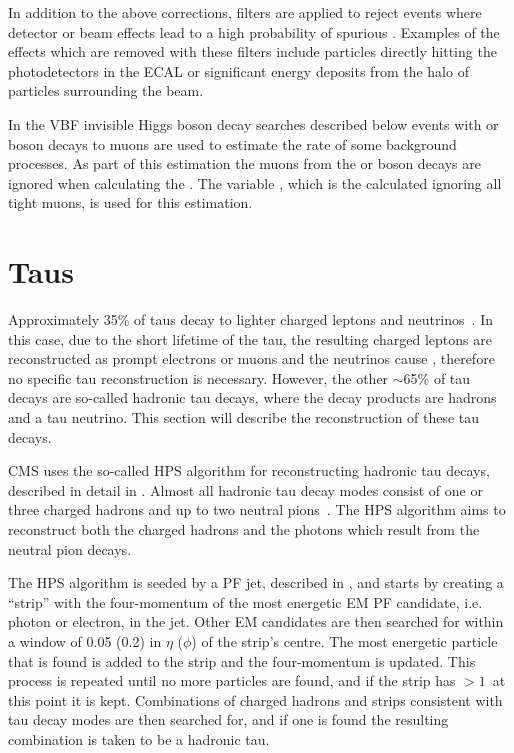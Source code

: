 {In addition to the above corrections, filters are applied to reject events where detector or beam effects lead to a high probability of spurious \MET. Examples of the effects which are removed with these filters include particles directly hitting the photodetectors in the \ac{ECAL} or significant energy deposits from the halo of particles surrounding the \LHC beam.

In the \ac{VBF} invisible Higgs boson decay searches described below events with \PW or \PZ boson decays to muons are used to estimate the rate of some background processes. As part of this estimation the muons from the \PW or \PZ boson decays are ignored when calculating the \MET. The variable \METnoMU, which is the \MET calculated ignoring all tight muons, is used for this estimation.
\section{Taus}
\label{sec:taus}
Approximately 35\% of taus decay to lighter charged leptons and neutrinos~\cite{pdg}. In this case, due to the short lifetime of the tau, the resulting charged leptons are reconstructed as prompt electrons or muons and the neutrinos cause \MET, therefore no specific tau reconstruction is necessary. However, the other $\sim$65\% of tau decays are so-called hadronic tau decays, where the decay products are hadrons and a tau neutrino. This section will describe the reconstruction of these tau decays.

CMS uses the so-called \ac{HPS} algorithm for reconstructing hadronic tau decays, described in detail in . Almost all hadronic tau decay modes consist of one or three charged hadrons and up to two neutral pions~\cite{pdg}. The \ac{HPS} algorithm aims to reconstruct both the charged hadrons and the photons which result from the neutral pion decays.

The \ac{HPS} algorithm is seeded by a \ac{PF} jet, described in , and starts by creating a ``strip'' with the four-momentum of the most energetic \ac{EM} \ac{PF} candidate, i.e. photon or electron, in the jet. Other \ac{EM} candidates are then searched for within  a window of 0.05 (0.2) in $\eta$ ($\phi$) of the strip's centre. The most energetic particle that is found is added to the strip and the four-momentum is updated. This process is repeated until no more particles are found, and if the strip has \pt$>1$\GeV\, at this point it is kept. Combinations of charged hadrons and strips consistent with tau decay modes are then searched for, and if one is found the resulting combination is taken to be a hadronic tau.

}
